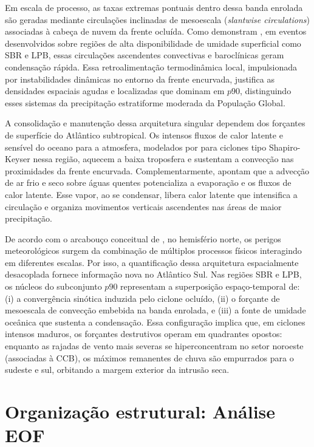 Em escala de processo, as taxas extremas pontuais dentro dessa banda enrolada são geradas mediante circulações inclinadas de mesoescala (\textit{slantwise circulations}) associadas à cabeça de nuvem da frente ocluída.
Como demonstram \citet{clark2005sting}, em eventos desenvolvidos sobre regiões de alta disponibilidade de umidade superficial como SBR e LPB, essas circulações ascendentes convectivas e baroclínicas geram condensação rápida.
Essa retroalimentação termodinâmica local, impulsionada por instabilidades dinâmicas no entorno da frente encurvada, justifica as densidades espaciais agudas e localizadas que dominam em $p90$, distinguindo esses sistemas da precipitação estratiforme moderada da População Global.

A consolidação e manutenção dessa arquitetura singular dependem dos forçantes de superfície do Atlântico subtropical.
Os intensos fluxos de calor latente e sensível do oceano para a atmosfera, modelados por \citet{gozzo2013air} para ciclones tipo Shapiro-Keyser nessa região, aquecem a baixa troposfera e sustentam a convecção nas proximidades da frente encurvada.
Complementarmente, \citet{andrade2024composite} apontam que a advecção de ar frio e seco sobre águas quentes potencializa a evaporação e os fluxos de calor latente. Esse vapor, ao se condensar, libera calor latente que intensifica a circulação e organiza movimentos verticais ascendentes nas áreas de maior precipitação.

De acordo com o arcabouço conceitual de \citet{zscheischler2018future}, no hemisfério norte, os perigos meteorológicos surgem da combinação de múltiplos processos físicos interagindo em diferentes escalas.
Por isso, a quantificação dessa arquitetura espacialmente desacoplada fornece informação nova no Atlântico Sul.
Nas regiões SBR e LPB, os núcleos do subconjunto $p90$ representam a superposição espaço-temporal de:
(i) a convergência sinótica induzida pelo ciclone ocluído,
(ii) o forçante de mesoescala de convecção embebida na banda enrolada, e
(iii) a fonte de umidade oceânica que sustenta a condensação.
Essa configuração implica que, em ciclones intensos maduros, os forçantes destrutivos operam em quadrantes opostos: enquanto as rajadas de vento mais severas se hiperconcentram no setor noroeste (associadas à CCB), os máximos remanentes de chuva são empurrados para o sudeste e sul, orbitando a margem exterior da intrusão seca.

\section{Organização estrutural: Análise EOF}\label{sec:eof_tp}


